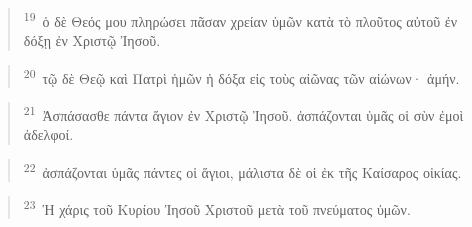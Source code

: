 \documentclass{article}
\newcommand{\currentverse}{1} %
\newcommand{\setcurrentverse}[1]{\renewcommand{\currentverse}{#1}}
\begin{document}
\begin{verse}

\setcurrentverse{19}

\setcounter{footnote}{0}

\textsuperscript{19}~ὁ δὲ Θεός μου πληρώσει πᾶσαν χρείαν ὑμῶν κατὰ τὸ πλοῦτος αὐτοῦ ἐν δόξῃ ἐν Χριστῷ Ἰησοῦ.

\end{verse}

\begin{verse}

\setcurrentverse{20}

\setcounter{footnote}{0}

\textsuperscript{20}~τῷ δὲ Θεῷ καὶ Πατρὶ ἡμῶν ἡ δόξα εἰς τοὺς αἰῶνας τῶν αἰώνων· ἀμήν.

\end{verse}

\begin{verse}

\setcurrentverse{21}

\setcounter{footnote}{0}

\textsuperscript{21}~Ἀσπάσασθε πάντα ἅγιον ἐν Χριστῷ Ἰησοῦ. ἀσπάζονται ὑμᾶς οἱ σὺν ἐμοὶ ἀδελφοί.

\end{verse}

\begin{verse}

\setcurrentverse{22}

\setcounter{footnote}{0}

\textsuperscript{22}~ἀσπάζονται ὑμᾶς πάντες οἱ ἅγιοι, μάλιστα δὲ οἱ ἐκ τῆς Καίσαρος οἰκίας.

\end{verse}

\begin{verse}

\setcurrentverse{23}

\setcounter{footnote}{0}

\textsuperscript{23}~Ἡ χάρις τοῦ Κυρίου Ἰησοῦ Χριστοῦ μετὰ τοῦ πνεύματος ὑμῶν.

\end{verse}
\end{document}
